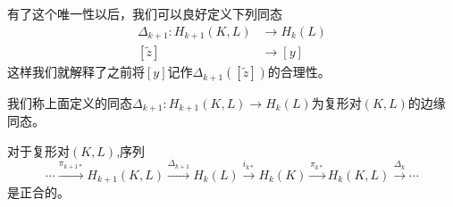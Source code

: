  有了这个唯一性以后，我们可以良好定义下列同态
 \begin{equation*}
     \begin{aligned}
      \Delta_{k+1}:H_{k+1}(K,L)&\rightarrow H_{k}(L)\\
      [\tilde{z}]&\rightarrow [y]
     \end{aligned}
 \end{equation*}
 这样我们就解释了之前将$[y]$记作$\Delta_{k+1}([\tilde{z}])$的合理性。
 \begin{definition}
 我们称上面定义的同态$\Delta_{k+1}:H_{k+1}(K,L)\rightarrow H_{k}(L)$为复形对$(K,L)$的边缘同态。
 \end{definition}
 \begin{proposition}\label{chap3_pro206}
 对于复形对$(K,L)$,序列
 $$\cdots \xrightarrow{\pi_{k+1*}} H_{k+1}(K,L)\xrightarrow{\Delta_{k+1}}H_{k}(L)\xrightarrow{i_{k*}}H_{k}(K)\xrightarrow{\pi_{k*}}H_{k}(K,L)\xrightarrow{\Delta_{k}}\cdots$$是正合的。
 \end{proposition}
